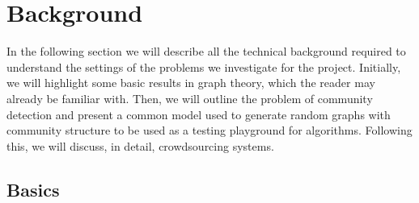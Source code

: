 \documentclass[12pt]{article}
\numberwithin{equation}{section}
\begin{document}
\newpage
\thispagestyle{plain}
\mbox{}
\section {Background}
\label{sec:background}

In the following section we will describe all the technical background required to understand the settings of the problems we investigate for the project. Initially, we will highlight some basic results in graph theory, which the reader may already be familiar with. Then, we will outline the problem of community detection and present a common model used to generate random graphs with community structure to be used as a testing playground for algorithms. Following this, we will discuss, in detail, crowdsourcing systems.

\subsection{Basics}
\label{sec:background;subsec:basics}
\end{document}
